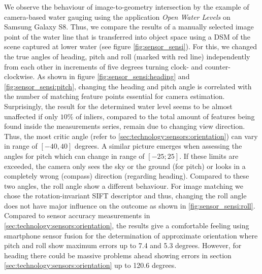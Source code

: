 \documentclass[review]{elsarticle}
\begin{document}
We observe the behaviour of image-to-geometry intersection by the example of camera-based water gauging using the application \textit{Open Water Levels} on Samsung Galaxy S8. Thus, we compare the results of a manually selected image point of the water line that is transferred into object space using a \gls{DSM} of the scene captured at lower water (see figure \ref{fig:sensor_sensi}). For this, we changed the true angles of heading, pitch and roll (marked with red line) independently from each other in increments of five degrees turning clock- and counter-clockwise.
As shown in figure \ref{fig:sensor_sensi:heading} and \ref{fig:sensor_sensi:pitch}, changing the heading and pitch angle is correlated with the number of matching feature points essential for camera estimation. Surprisingly, the result for the determined water level seems to be almost unaffected if only $10\%$ of inliers, compared to the total amount of features being found inside the measurements series, remain due to changing view direction. Thus, the most critic angle (refer to \ref{sec:technology:sensors:orientation}) can vary in range of $[-40,40]$ degrees. A similar picture emerges when assessing the angles for pitch which can change in range of $[-25;25]$. If these limits are exceeded, the camera only sees the sky or the ground (for pitch) or looks in a completely wrong (compass) direction (regarding heading). Compared to these two angles, the roll angle show a different behaviour. For image matching we chose the rotation-invariant \gls{SIFT} descriptor \cite{Lowe2004} and thus, changing the roll angle does not have major influence on the outcome as shown in \ref{fig:sensor_sensi:roll}.
Compared to sensor accuracy measurements in \ref{sec:technology:sensors:orientation}, the results give a comfortable feeling using smartphone sensor fusion for the determination of approximate orientation where pitch and roll show maximum errors up to 7.4 and 5.3 degrees. However, for heading there could be massive problems ahead showing errors in section \ref{sec:technology:sensors:orientation} up to 120.6 degrees.
\end{document}
